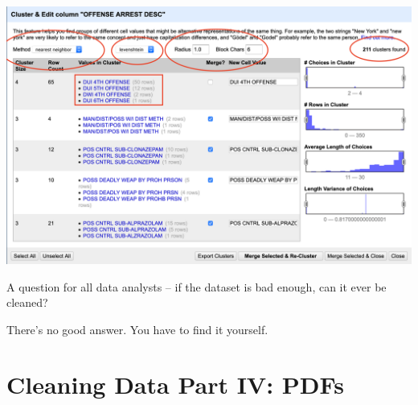 \documentclass[]{book}
\begin{document}
\includegraphics[width=27.81in]{images/open8}

A question for all data analysts -- if the dataset is bad enough, can it ever be cleaned?

There's no good answer. You have to find it yourself.

\hypertarget{cleaning-data-part-iv-pdfs}{%
\chapter{Cleaning Data Part IV: PDFs}\label{cleaning-data-part-iv-pdfs}}
\end{document}
